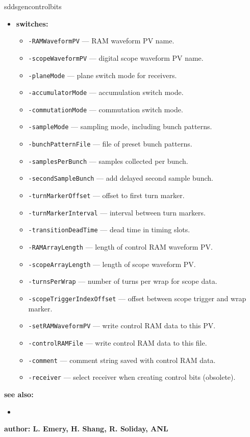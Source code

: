 \begin{sddsprog}{sddsgencontrolbits}
\begin{itemize}
\item {\bf switches:}
    \begin{itemize}
    \item {\tt -RAMWaveformPV} --- RAM waveform PV name.
    \item {\tt -scopeWaveformPV} --- digital scope waveform PV name.
    \item {\tt -planeMode} --- plane switch mode for receivers.
    \item {\tt -accumulatorMode} --- accumulation switch mode.
    \item {\tt -commutationMode} --- commutation switch mode.
    \item {\tt -sampleMode} --- sampling mode, including bunch patterns.
    \item {\tt -bunchPatternFile} --- file of preset bunch patterns.
    \item {\tt -samplesPerBunch} --- samples collected per bunch.
    \item {\tt -secondSampleBunch} --- add delayed second sample bunch.
    \item {\tt -turnMarkerOffset} --- offset to first turn marker.
    \item {\tt -turnMarkerInterval} --- interval between turn markers.
    \item {\tt -transitionDeadTime} --- dead time in timing slots.
    \item {\tt -RAMArrayLength} --- length of control RAM waveform PV.
    \item {\tt -scopeArrayLength} --- length of scope waveform PV.
    \item {\tt -turnsPerWrap} --- number of turns per wrap for scope data.
    \item {\tt -scopeTriggerIndexOffset} --- offset between scope trigger and wrap marker.
    \item {\tt -setRAMWaveformPV} --- write control RAM data to this PV.
    \item {\tt -controlRAMFile} --- write control RAM data to this file.
    \item {\tt -comment} --- comment string saved with control RAM data.
    \item {\tt -receiver} --- select receiver when creating control bits (obsolete).
    \end{itemize}
\end{itemize}

\item {\bf see also:}
    \begin{itemize}
    \item {}
    \end{itemize}
\item {\bf author: L. Emery, H. Shang, R. Soliday, ANL}
\end{sddsprog}
